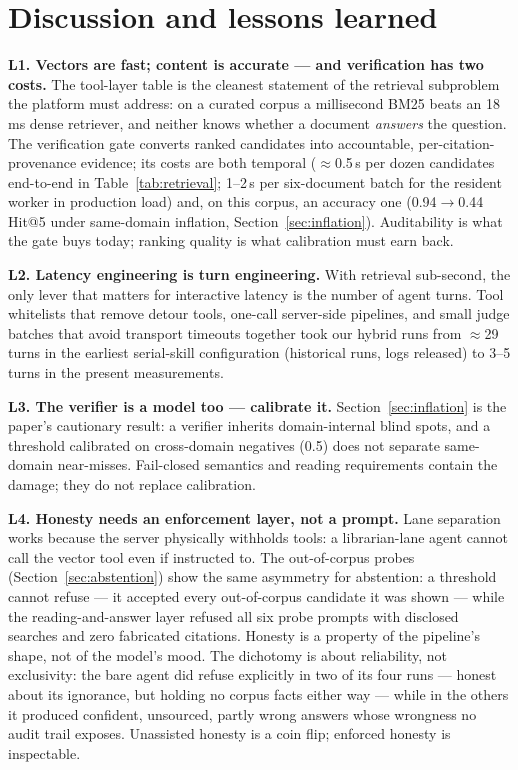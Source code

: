 \documentclass[preprint,12pt]{elsarticle}
\begin{document}
\section{Discussion and lessons learned}
\label{sec:discussion}

\textbf{L1. Vectors are fast; content is accurate --- and verification has
two costs.} The tool-layer table is the cleanest statement of the retrieval
subproblem the platform must address: on a curated corpus a millisecond
BM25 beats an 18\,ms dense retriever, and neither knows whether a document
\emph{answers} the question. The verification gate converts ranked
candidates into accountable, per-citation-provenance evidence; its costs
are both temporal ($\approx$0.5\,s per dozen candidates end-to-end in
Table~\ref{tab:retrieval}; 1--2\,s per six-document batch for the
resident worker in production load) and, on this corpus, an accuracy one
(0.94$\to$0.44 Hit@5 under same-domain inflation,
Section~\ref{sec:inflation}). Auditability is what the gate buys today;
ranking quality is what calibration must earn back.

\textbf{L2. Latency engineering is turn engineering.} With retrieval
sub-second, the only lever that matters for interactive latency is the
number of agent turns. Tool whitelists that remove detour tools, one-call
server-side pipelines, and small judge batches that avoid transport
timeouts together took our hybrid runs from $\approx$29 turns in the
earliest serial-skill configuration (historical runs, logs released) to
3--5 turns in the present measurements.


\textbf{L3. The verifier is a model too --- calibrate it.}
Section~\ref{sec:inflation} is the paper's cautionary result: a verifier
inherits domain-internal blind spots, and a threshold calibrated on
cross-domain negatives (0.5) does not separate same-domain near-misses.
Fail-closed semantics and reading requirements contain the damage; they do
not replace calibration.

\textbf{L4. Honesty needs an enforcement layer, not a prompt.} Lane
separation works because the server physically withholds tools: a
librarian-lane agent cannot call the vector tool even if instructed to.
The out-of-corpus probes (Section~\ref{sec:abstention}) show the same
asymmetry for abstention: a threshold cannot refuse --- it accepted every
out-of-corpus candidate it was shown --- while the reading-and-answer
layer refused all six probe prompts with disclosed searches and zero
fabricated citations. Honesty is a property of the pipeline's shape, not
of the model's mood. The dichotomy is about reliability, not exclusivity:
the bare agent did refuse explicitly in two of its four runs --- honest
about its ignorance, but holding no corpus facts either way --- while in
the others it produced confident, unsourced, partly wrong answers whose
wrongness no audit trail exposes. Unassisted honesty is a coin flip;
enforced honesty is inspectable.
\end{document}
